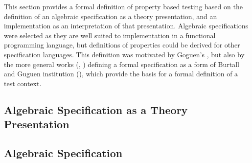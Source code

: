 
This section provides a formal definition of property based testing
based on the definition of an algebraic specification as a theory presentation,
and an implementation as an interpretation of that presentation.
Algebraic specifications were selected as they are well suited to 
implementation in a functional programming language,
but definitions of properties could be derived for other specification languages.
This definition was motivated by Goguen's \cite{GoguenIBM1977},
but also by the more general works (\cite{BernotGaudelMarre1991}, \cite{Bernot1991})
defining a formal specification as a form of Burtall and Guguen institution (\cite{BurstallGoguen1977}),
which provide the basis for a formal definition of a test context.

\subsection{Algebraic Specification as a Theory Presentation}\label{formal_spec}



\subsection{Algebraic Specification}


